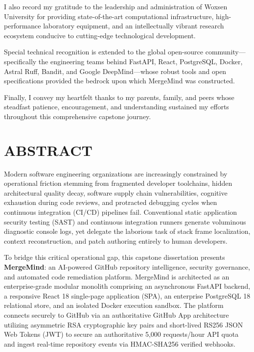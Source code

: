 \documentclass[12pt,a4paper,oneside]{report}
\begin{document}
\vspace{0.4cm}
I also record my gratitude to the leadership and administration of Woxsen University for providing state-of-the-art computational infrastructure, high-performance laboratory equipment, and an intellectually vibrant research ecosystem conducive to cutting-edge technological development.

\vspace{0.4cm}
Special technical recognition is extended to the global open-source community—specifically the engineering teams behind FastAPI, React, PostgreSQL, Docker, Astral Ruff, Bandit, and Google DeepMind—whose robust tools and open specifications provided the bedrock upon which MergeMind was constructed.

\vspace{0.4cm}
Finally, I convey my heartfelt thanks to my parents, family, and peers whose steadfast patience, encouragement, and understanding sustained my efforts throughout this comprehensive capstone journey.

\cleardoublepage

\chapter*{ABSTRACT}

Modern software engineering organizations are increasingly constrained by operational friction stemming from fragmented developer toolchains, hidden architectural quality decay, software supply chain vulnerabilities, cognitive exhaustion during code reviews, and protracted debugging cycles when continuous integration (CI/CD) pipelines fail. Conventional static application security testing (SAST) and continuous integration runners generate voluminous diagnostic console logs, yet delegate the laborious task of stack frame localization, context reconstruction, and patch authoring entirely to human developers.

\vspace{0.4cm}
To bridge this critical operational gap, this capstone dissertation presents \textbf{MergeMind}: an AI-powered GitHub repository intelligence, security governance, and automated code remediation platform. MergeMind is architected as an enterprise-grade modular monolith comprising an asynchronous FastAPI backend, a responsive React 18 single-page application (SPA), an enterprise PostgreSQL 18 relational store, and an isolated Docker execution sandbox. The platform connects securely to GitHub via an authoritative GitHub App architecture utilizing asymmetric RSA cryptographic key pairs and short-lived RS256 JSON Web Tokens (JWT) to secure an authoritative 5,000 requests/hour API quota and ingest real-time repository events via HMAC-SHA256 verified webhooks.
\end{document}
